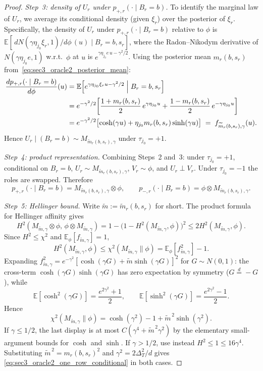 \documentclass[10pt]{article}
\newcommand{\Ebb}{\mathbb E}
\newcommand{\trg}{T}
\newcommand{\DeltaT}{\Delta_{\trg}}
\begin{document}
\begin{proof}
\medskip
\noindent\textit{Step~3: density of $U_r$ under $p_{+,r}(\cdot\mid B_r=b)$.}
To identify the marginal law of $U_r$, we average its conditional density
(given $\xi_r$) over the posterior of $\xi_r$. Specifically, the density of
$U_r$ under $p_{+,r}(\cdot\mid B_r=b)$ relative to $\phi$ is
$\Ebb[\,dN(\gamma\eta_{j_0}\xi_r,1)/d\phi\,(u)\mid B_r=b,s_r]$,
where the Radon--Nikodym derivative of $N(\gamma\eta_{j_0} e,1)$ w.r.t.\ $\phi$
at $u$ is $e^{\gamma\eta_{j_0} e\,u-\gamma^2/2}$. Using the posterior mean
$m_r(b,s_r)$ from~\eqref{eq:sec3_oracle2_posterior_mean}:
\begin{align*}
    \frac{dp_{+,r}(\cdot\mid B_r=b)}{d\phi}(u)
    &=
    \Ebb\!\left[e^{\gamma\eta_{j_0}\xi_r u-\gamma^2/2}\Bigm|B_r=b,s_r\right]\\
    &=
    e^{-\gamma^2/2}
    \!\left[
        \frac{1+m_r(b,s_r)}{2}\,e^{\gamma\eta_{j_0} u}
        +
        \frac{1-m_r(b,s_r)}{2}\,e^{-\gamma\eta_{j_0} u}
    \right]\\
    &=
    e^{-\gamma^2/2}\bigl[\cosh(\gamma u)+\eta_{j_0} m_r(b,s_r)\sinh(\gamma u)\bigr]
    \;=\;
    f_{\widetilde m_r(b,s_r),\gamma}(u).
\end{align*}
Hence $U_r\mid(B_r=b)\sim M_{\widetilde m_r(b,s_r),\gamma}$ under $\tau_{j_0}=+1$.

\medskip
\noindent\textit{Step~4: product representation.}
Combining Steps~2 and~3: under $\tau_{j_0}=+1$, conditional on $B_r=b$,
$U_r\sim M_{\widetilde m_r(b,s_r),\gamma}$, $V_r\sim\phi$, and $U_r\perp V_r$.
Under $\tau_{j_0}=-1$ the roles are swapped. Therefore
\[
    p_{+,r}(\cdot\mid B_r=b)=M_{\widetilde m_r(b,s_r),\gamma}\otimes\phi,
    \qquad
    p_{-,r}(\cdot\mid B_r=b)=\phi\otimes M_{\widetilde m_r(b,s_r),\gamma}.
\]

\medskip
\noindent\textit{Step~5: Hellinger bound.}
Write $\widetilde m:=\widetilde m_r(b,s_r)$ for short. The product formula for
Hellinger affinity gives
\[
    H^2(M_{\widetilde m,\gamma}\otimes\phi,\,\phi\otimes M_{\widetilde m,\gamma})
    =
    1-\bigl(1-H^2(M_{\widetilde m,\gamma},\phi)\bigr)^2
    \le
    2H^2(M_{\widetilde m,\gamma},\phi).
\]
Since $H^2\le\chi^2$ and $\Ebb_\phi[f_{\widetilde m,\gamma}]=1$,
\[
    H^2(M_{\widetilde m,\gamma},\phi)
    \le
    \chi^2(M_{\widetilde m,\gamma}\|\phi)
    =
    \Ebb_\phi\!\left[f_{\widetilde m,\gamma}^2\right]-1.
\]
Expanding $f_{\widetilde m,\gamma}^2=e^{-\gamma^2}[\cosh(\gamma G)+\widetilde m\sinh(\gamma G)]^2$
for $G\sim N(0,1)$: the cross-term $\cosh(\gamma G)\sinh(\gamma G)$ has zero
expectation by symmetry ($G\overset{d}{=}-G$), while
\[
    \Ebb[\cosh^2(\gamma G)]=\frac{e^{2\gamma^2}+1}{2},
    \qquad
    \Ebb[\sinh^2(\gamma G)]=\frac{e^{2\gamma^2}-1}{2}.
\]
Hence
\[
    \chi^2(M_{\widetilde m,\gamma}\|\phi)
    =
    \cosh(\gamma^2)-1+\widetilde m^{\,2}\sinh(\gamma^2).
\]
If $\gamma\le 1/2$, the last display is at most
$C(\gamma^4+\widetilde m^{\,2}\gamma^2)$ by the elementary small-argument
bounds for $\cosh$ and $\sinh$.  If $\gamma>1/2$, use instead
$H^2\le 1\le 16\gamma^4$.  Substituting
$\widetilde m^{\,2}=m_r(b,s_r)^2$ and
$\gamma^2=2\DeltaT^2/d$ gives
\eqref{eq:sec3_oracle2_one_row_conditional} in both cases.
\end{proof}
\end{document}
